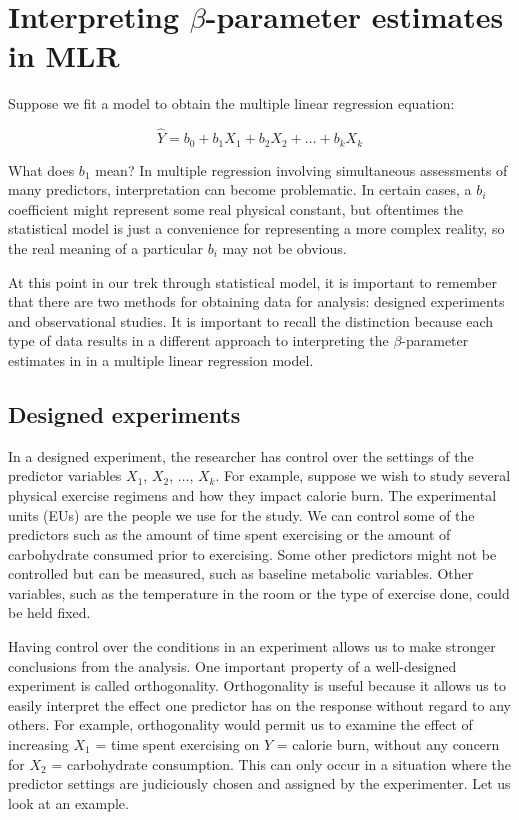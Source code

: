 \documentclass[
]{book}
\begin{document}
\hypertarget{interpreting-beta-parameter-estimates-in-mlr}{%
\section{\texorpdfstring{Interpreting \(\beta\)-parameter estimates in MLR}{Interpreting \textbackslash beta-parameter estimates in MLR}}\label{interpreting-beta-parameter-estimates-in-mlr}}

Suppose we fit a model to obtain the multiple linear regression equation:

\[\hat{Y} = b_0 + b_1 X_1 + b_2 X_2 + \ldots + b_k X_k\]

What does \(b_1\) mean?
In multiple regression involving simultaneous assessments of many predictors, interpretation can become problematic.
In certain cases, a \(b_i\) coefficient might represent some real physical constant, but oftentimes the statistical model is just a convenience for representing a more complex reality, so the real meaning of a particular \(b_i\) may not be obvious.

At this point in our trek through statistical model, it is important to remember that there are two methods for obtaining data for analysis: designed experiments and observational studies.
It is important to recall the distinction because each type of data results in a different approach to interpreting the \(\beta\)-parameter estimates in in a multiple linear regression model.

\hypertarget{designed-experiments-1}{%
\subsection{Designed experiments}\label{designed-experiments-1}}

In a designed experiment, the researcher has control over the settings of the predictor variables \(X_1\), \(X_2\), \(\ldots\), \(X_k\).
For example, suppose we wish to study several physical exercise regimens and how they impact calorie burn.
The experimental units (EUs) are the people we use for the study.
We can control some of the predictors such as the amount of time spent exercising or the amount of carbohydrate consumed prior to exercising.
Some other predictors might not be controlled but can be measured, such as baseline metabolic variables.
Other variables, such as the temperature in the room or the type of exercise done, could be held fixed.

Having control over the conditions in an experiment allows us to make stronger conclusions from the analysis.
One important property of a well-designed experiment is called orthogonality.
Orthogonality is useful because it allows us to easily interpret the effect one predictor has on the response without regard to any others.
For example, orthogonality would permit us to examine the effect of increasing \(X_1\) = time spent exercising on \(Y\) = calorie burn, without any concern for \(X_2\) = carbohydrate consumption.
This can only occur in a situation where the predictor settings are judiciously chosen and assigned by the experimenter.
Let us look at an example.
\end{document}
